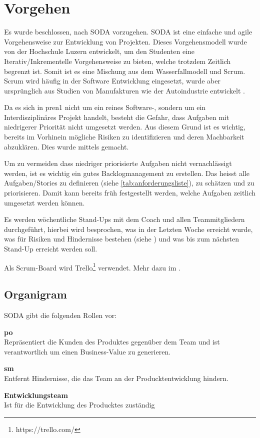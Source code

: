 \newpage
\section{Vorgehen}
Es wurde beschlossen, nach SODA \cite{Wikipedia-Scrum} vorzugehen.
SODA ist eine einfache und agile Vorgehensweise zur Entwicklung von Projekten. Dieses Vorgehensmodell wurde von der Hochschule Luzern entwickelt, um den Studenten eine Iterativ/Inkrementelle Vorgehensweise zu bieten, welche trotzdem Zeitlich begrenzt ist. Somit ist es eine Mischung aus dem Wasserfallmodell und Scrum. Scrum wird häufig in der Software Entwicklung eingesetzt, wurde aber ursprünglich aus Studien von Manufakturen wie der Autoindustrie entwickelt \cite{Wikipedia-Scrum-History}.

Da es sich in \acrshort{pren}1 nicht um ein reines Software-, sondern um
ein Interdisziplinäres Projekt handelt, besteht die Gefahr, dass Aufgaben
mit niedrigerer Priorität nicht umgesetzt werden. Aus diesem Grund ist es
wichtig, bereits im Vorhinein mögliche Risiken zu identifizieren und deren Machbarkeit
abzuklären. Dies wurde mittels  gemacht.

Um zu vermeiden dass niedriger priorisierte Aufgaben nicht vernachlässigt werden,
ist es wichtig ein gutes Backlogmanagement zu erstellen. Das heisst alle Aufgaben/Stories zu definieren (siehe \ref{tab:anforderungsliste}), zu schätzen und zu priorisieren. Damit kann bereits früh festgestellt werden, welche Aufgaben zeitlich umgesetzt werden können.

Es werden wöchentliche Stand-Ups mit dem Coach und allen Teammitgliedern durchgeführt, hierbei wird besprochen, was in der Letzten Woche erreicht wurde, was für Risiken und Hindernisse bestehen (siehe ) und was bis zum nächsten Stand-Up erreicht werden soll.

Als Scrum-Board wird Trello\footnote{https://trello.com/} verwendet. Mehr dazu im .

\subsection{Organigram}
SODA gibt die folgenden Rollen vor:

\begin{items}
  \item {\bf \acrfull{po}} \\
    Repräsentiert die Kunden des Produktes gegenüber dem Team 
    und ist verantwortlich um einen Business-Value zu generieren.
  \item {\bf \acrfull{sm}} \\
    Entfernt Hindernisse, die das Team an der Producktentwicklung hindern.
  \item {\bf Entwicklungsteam} \\
    Ist für die Entwicklung des Producktes zuständig
\end{items}

